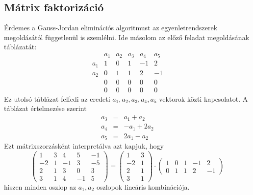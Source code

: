 \documentclass[9pt, showtrims]{memoir}
\theoremstyle{plain}
\theoremstyle{remark}
\theoremstyle{definition}
\begin{document}
\subsection{Mátrix faktorizáció}
Érdemes a Gauss-Jordan eliminációs algoritmust az egyenletrendszerek megoldásától függetlenül is szemlélni.
Ide másolom az előző feladat megoldásának táblázatát:
\[
    \begin{array}{r|rrrrr}
        &a_1&a_2&a_3&a_4&a_5\\
        \hline
        a_1&1&0&1&-1&2\\
        a_2&0&1&1&2&-1\\
        &0&0&0&0&0\\
        &0&0&0&0&0
    \end{array}
\]
Ez utolsó táblázat felfedi az eredeti $a_1,a_2,a_3,a_4,a_5$ vektorok közti kapcsolatot.
A táblázat értelmezése szerint
\begin{eqnarray*}
    a_3&=& a_1+a_2\\
    a_4&=& -a_1+2a_2\\
    a_5&=& 2a_1-a_2
\end{eqnarray*}
Ezt mátrixszorzásként interpretálva azt kapjuk, hogy
\[
    \begin{pmatrix}
        1&3&4&5&-1\\
        -2&1&-1&3&-5\\
        2&1&3&0&3\\
        3&1&4&-1&5
    \end{pmatrix}
    =
    \begin{pmatrix}
        1&3\\
        -2&1\\
        2&1\\
        3&1
    \end{pmatrix}
    \cdot
    \begin{pmatrix}
        1&0&1&-1&2\\
        0&1&1&2&-1
    \end{pmatrix}
\]
hiszen minden oszlop az $a_1,a_2$ oszlopok lineáris kombinációja.
\end{document}

